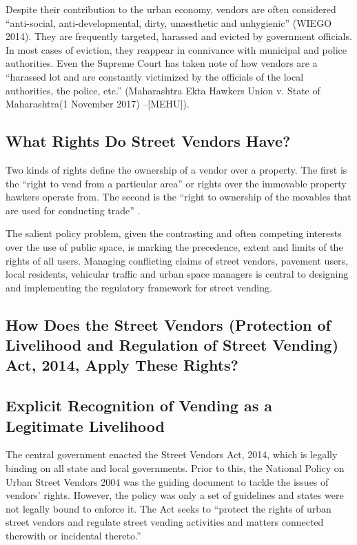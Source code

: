 \documentclass[a4paper, 12pt, twoside]{article}
\begin{document}
Despite their contribution to the urban economy, vendors are often considered “anti-social, anti-developmental, dirty, unaesthetic and unhygienic” (WIEGO 2014). They are frequently targeted, harassed and evicted by government officials. In most cases of eviction, they reappear in connivance with municipal and police authorities. Even the Supreme Court has taken note of how vendors are a “harassed lot and are constantly victimized by the officials of the local authorities, the police, etc.” (Maharashtra Ekta Hawkers Union v. State of Maharashtra(1 November 2017) –[MEHU]).


\subsection*{What Rights Do Street Vendors Have?}

Two kinds of rights define the ownership of a vendor over a property. The first is the “right to vend from a particular area” or rights over the immovable property hawkers operate from. The second is the “right to ownership of the movables that are used for conducting trade” \parencite{ccspaper}.

The salient policy problem, given the contrasting and often competing interests over the use of public space, is marking the precedence, extent and limits of the rights of all users. Managing conflicting claims of street vendors, pavement users, local residents, vehicular traffic and urban space managers is central to designing and implementing the regulatory framework for street vending.
\newpage
\subsection*{How Does the Street Vendors (Protection of Livelihood and Regulation of Street Vending) Act, 2014, Apply These Rights?}

\subsection*{Explicit Recognition of Vending as a Legitimate Livelihood}

The central government enacted the Street Vendors Act, 2014, which is legally binding on all state and local governments. Prior to this, the National Policy on Urban Street Vendors 2004 was the guiding document to tackle the issues of vendors’ rights. However, the policy was only a set of guidelines and states were not legally bound to enforce it. The Act seeks to “protect the rights of urban street vendors and regulate street vending activities and matters connected therewith or incidental thereto.”
\end{document}
